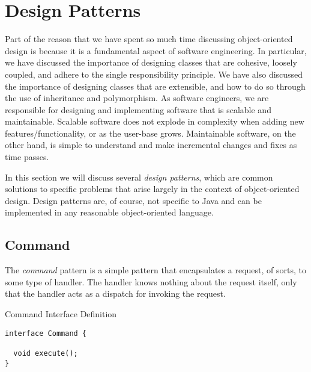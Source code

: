 \section{Design Patterns}

Part of the reason that we have spent so much time discussing object-oriented design is because it is a fundamental aspect of software engineering. In particular, we have discussed the importance of designing classes that are cohesive, loosely coupled, and adhere to the single responsibility principle. We have also discussed the importance of designing classes that are extensible, and how to do so through the use of inheritance and polymorphism. As software engineers, we are responsible for designing and implementing software that is scalable and maintainable. Scalable software does not explode in complexity when adding new features/functionality, or as the user-base grows. Maintainable software, on the other hand, is simple to understand and make incremental changes and fixes as time passes. 

In this section we will discuss several \emph{design patterns}, which are common solutions to specific problems that arise largely in the context of object-oriented design. Design patterns are, of course, not specific to Java and can be implemented in any reasonable object-oriented language. 

\subsection{Command}

The \emph{command} pattern is a simple pattern that encapsulates a request, of sorts, to some type of handler. The handler knows nothing about the request itself, only that the handler acts as a dispatch for invoking the request.


\begin{cl}{Command Interface Definition}
\begin{lstlisting}[language=MyJava]
interface Command {

  void execute();
}
\end{lstlisting}
\end{cl}

